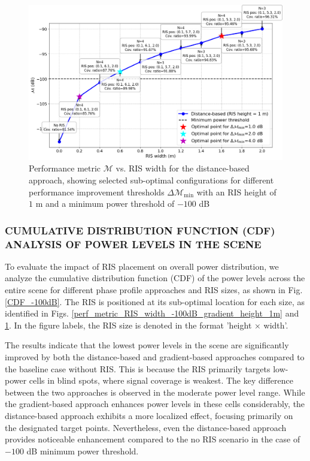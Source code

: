 \documentclass{IEEEoj}
\begin{document}
\begin{figure}
	\centering
	\includegraphics[width=\linewidth]{Sim_Results/perf_metric_RIS_width_-100dB_distance_height_1m.png}
	\caption{Performance metric $\mathcal{M}$ vs. RIS width for the distance-based approach, showing selected sub-optimal configurations for different performance improvement thresholds $\Delta \mathcal{M}_{\text{min}}$ with an RIS height of $1$ m and a minimum power threshold of $-100$ dB}
	\label{perf_metric_RIS_width_-100dB_distance_height_1m}
\end{figure}

\subsubsection{CUMULATIVE DISTRIBUTION FUNCTION (CDF) ANALYSIS OF POWER LEVELS IN THE SCENE}
To evaluate the impact of RIS placement on overall power distribution, we analyze the cumulative distribution function (CDF) of the power levels across the entire scene for different phase profile approaches and RIS sizes, as shown in Fig. \ref{CDF_-100dB}. The RIS is positioned at its sub-optimal location for each size, as identified in Figs. \ref{perf_metric_RIS_width_-100dB_gradient_height_1m} and \ref{perf_metric_RIS_width_-100dB_distance_height_1m}. In the figure labels, the RIS size is denoted in the format 'height × width'.

The results indicate that the lowest power levels in the scene are significantly improved by both the distance-based and gradient-based approaches compared to the baseline case without RIS. This is because the RIS primarily targets low-power cells in blind spots, where signal coverage is weakest. The key difference between the two approaches is observed in the moderate power level range. While the gradient-based approach enhances power levels in these cells considerably, the distance-based approach exhibits a more localized effect, focusing primarily on the designated target points. Nevertheless, even the distance-based approach provides noticeable enhancement compared to the no RIS scenario in the case of $-100$ dB minimum power threshold.
\end{document}
